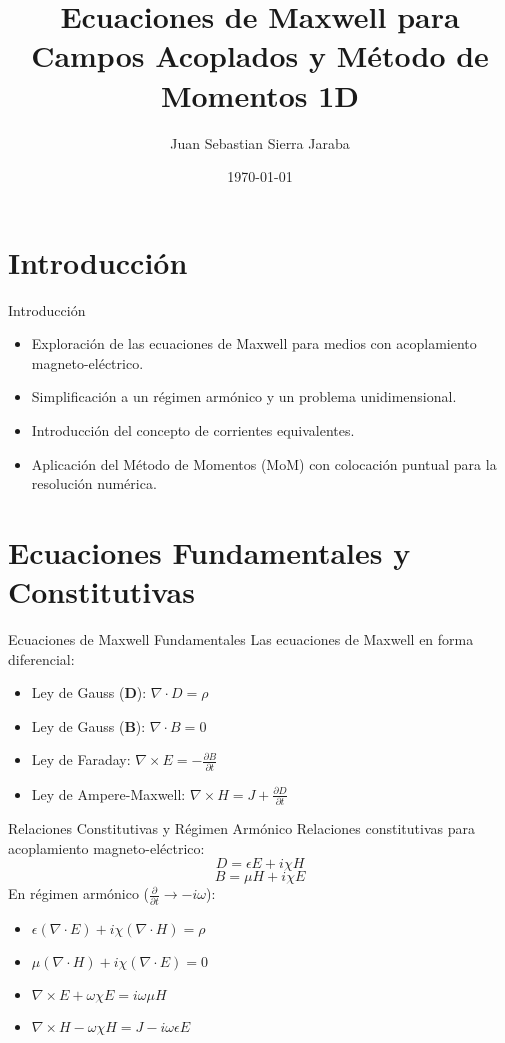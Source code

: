 \documentclass{beamer}
\title{Ecuaciones de Maxwell para Campos Acoplados y Método de Momentos 1D}
\author{Juan Sebastian Sierra Jaraba}
\date{\today}
\begin{document}
\begin{frame}
    \titlepage
\end{frame}

\section{Introducción}
\begin{frame}{Introducción}
    \begin{itemize}
        \item Exploración de las ecuaciones de Maxwell para medios con acoplamiento magneto-eléctrico.
        \item Simplificación a un régimen armónico y un problema unidimensional.
        \item Introducción del concepto de corrientes equivalentes.
        \item Aplicación del Método de Momentos (MoM) con colocación puntual para la resolución numérica.
    \end{itemize}
\end{frame}

\section{Ecuaciones Fundamentales y Constitutivas}
\begin{frame}{Ecuaciones de Maxwell Fundamentales}
    Las ecuaciones de Maxwell en forma diferencial:
    \begin{itemize}
        \item Ley de Gauss ($\mathbf{D}$): $\nabla \cdot D = \rho$
        \item Ley de Gauss ($\mathbf{B}$): $\nabla \cdot B = 0$
        \item Ley de Faraday: $\nabla \times E = -\frac{\partial B}{\partial t}$
        \item Ley de Ampere-Maxwell: $\nabla \times H = J + \frac{\partial D}{\partial t}$
    \end{itemize}
\end{frame}

\begin{frame}{Relaciones Constitutivas y Régimen Armónico}
    Relaciones constitutivas para acoplamiento magneto-eléctrico:
    $$D = \epsilon E + i\chi H$$
    $$B = \mu H + i\chi E$$
    En régimen armónico ($\frac{\partial}{\partial t} \rightarrow -i\omega$):
    \begin{itemize}
        \item $\epsilon (\nabla \cdot E) + i\chi (\nabla \cdot H) = \rho$
        \item $\mu (\nabla \cdot H) + i\chi (\nabla \cdot E) = 0$
        \item $\nabla \times E + \omega\chi E = i\omega\mu H$
        \item $\nabla \times H - \omega\chi H = J - i\omega\epsilon E$
    \end{itemize}
\end{frame}
\end{document}
